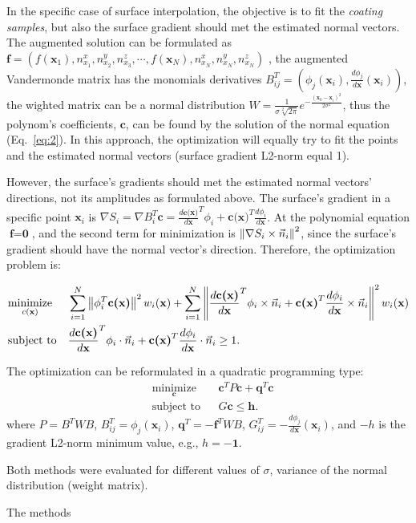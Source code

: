 In the specific case of surface interpolation, the objective is to fit the
\textit{coating samples}, but also the surface gradient should met the
estimated normal vectors. The augmented solution can be formulated as
$\textbf{f}=(f(\textbf{x}_1),n^x_{x_1},n^y_{x_2},n^z_{x_3},\cdots,f(\textbf{x}_N),n^x_{x_N},n^y_{x_N},n^z_{x_N})$
\cite{juttler2002least},  the augmented Vandermonde matrix has the monomials
derivatives $B_{ij}^T = (\phi_j(\textbf{x}_i),
\frac{d\phi_j}{d\textbf{x}}(\textbf{x}_i))$, the wighted matrix can be a
normal distribution
$W=\frac{1}{\sigma\sqrt[2]{2\pi}}e^{-\frac{(\textbf{x}_0-\textbf{x}_i)^2}{2\sigma^2}}$,
thus the polynom's coefficients, $\textbf{c}$, can be found by the solution of
the normal equation (Eq.~\ref{eq:2}). In this approach, the optimization will
equally try to fit the points and the estimated normal vectors (surface
gradient L2-norm equal 1).
 
However, the surface's gradients should met the estimated
normal vectors' directions, not its amplitudes as formulated above.
The surface's gradient in a specific point $\textbf{x}_i$ is
$\nabla
S_i=\nabla
B_i^T\textbf{c}=\frac{d\textbf{c(x)}}{d\textbf{x}}^T\phi_i+\textbf{c(x)}^T\frac{d\phi_i}{d\textbf{x}}$.
At the polynomial equation $\textbf{f}=\textbf{0}$, and the second term for
minimization is $\left\lVert\nabla S_i\times \vec{n}_i\right\rVert^2$, since the surface's
gradient should have the normal vector's direction. Therefore, the
optimization problem is:

\begin{equation}
\begin{aligned}
& \underset{c(\textbf{x})}{\text{minimize}}
& &  \sum^N_{i=1}
\left\lVert \phi_i^T\textbf{c(x)}\right\rVert^2w_{i}(\textbf{x})+\sum^N_{i=1}
\left\lVert\frac{d\textbf{c(x)}}{d\textbf{x}}^T\phi_i\times
\vec{n}_i+\textbf{c(x)}^T\frac{d\phi_i}{d\textbf{x}}\times
\vec{n}_i\right\rVert^2w_{i}(\textbf{x})\\
& \text{subject to}
& & \frac{d\textbf{c(x)}}{d\textbf{x}}^T\phi_i\cdot
\vec{n}_i+\textbf{c(x)}^T\frac{d\phi_i}{d\textbf{x}}\cdot
\vec{n}_i \geq 1.  
\end{aligned}
\end{equation}

The optimization can be reformulated in a quadratic programming type:
\begin{equation}
\begin{aligned}
& \underset{\textbf{c}}{\text{minimize}}
& &  \textbf{c}^TP\textbf{c}+\textbf{q}^T\textbf{c}\\
& \text{subject to}
& & G\textbf{c} \leq \textbf{h}. 
\end{aligned}
\label{eq:3}
\end{equation}
where $P=B^TWB$, $B_{ij}^T=\phi_j(\textbf{x}_i)$,
$\textbf{q}^T=-\textbf{f}^TWB$,
$G_{ij}^T=-\frac{d\phi_j}{d\textbf{x}}(\textbf{x}_i)$, and $-h$ is the gradient
L2-norm minimum value, e.g., $h=-\textbf{1}$.

Both methods were evaluated for different values of $\sigma$, variance of the
normal distribution (weight matrix).

The methods

